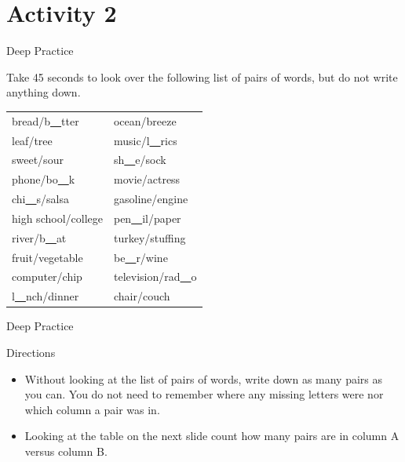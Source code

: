 \documentclass[10pt]{beamer}
\begin{document}

\section{Activity 2}


\begin{frame}{Deep Practice}

\vspace{2em}

Take 45 seconds to look over the following list of pairs of words, but do not write anything down.

\begin{table}[h]
\centering
\begin{tabular}{@{}ll@{}}
\toprule
bread/b\underline{\ \ }tter & ocean/breeze \\
leaf/tree & music/l\underline{\ \ }rics\\
sweet/sour & sh\underline{\ \ }e/sock\\
phone/bo\underline{\ \ }k & movie/actress \\
chi\underline{\ \ }s/salsa & gasoline/engine \\
high school/college & pen\underline{\ \ }il/paper\\
river/b\underline{\ \ }at & turkey/stuffing \\
fruit/vegetable & be\underline{\ \ }r/wine\\
computer/chip & television/rad\underline{\ \ }o\\
l\underline{\ \ }nch/dinner & chair/couch \\
\bottomrule
\end{tabular}
\end{table}

\end{frame}


\begin{frame}{Deep Practice}

\vspace{2em}

\begin{block}{Directions}
\vspace{-.75em}
\begin{itemize}
\item Without looking at the list of pairs of words, write down as many pairs as you can.  You do not need to remember where any missing letters were nor which column a pair was in.
\item Looking at the table on the next slide count how many pairs are in column A versus column B.
\end{itemize}
\end{block}

\end{frame}
\end{document}
